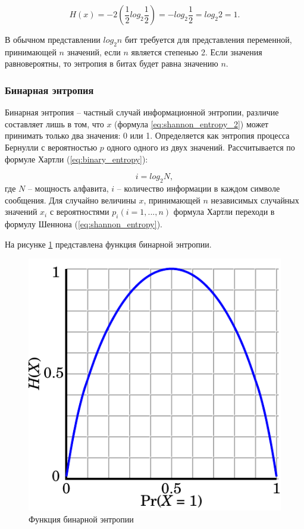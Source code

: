 \begin{equation}\label{eq:moneta}
	H(x) = -2(\frac{1}{2}log_{2}{\frac{1}{2}}) = -log_{2}{\frac{1}{2}}=log_{2}{2} = 1.
\end{equation}

В обычном представлении $log_{2}n$ бит требуется для представления переменной, принимающей $n$ значений, если $n$ является степенью 2. Если значения равновероятны, то энтропия в битах будет равна значению $n$.

\subsubsection{Бинарная энтропия}

Бинарная энтропия -- частный случай информационной энтропии, различие составляет лишь в том, что $x$ (формула \ref{eq:shannon_entropy_2}) может принимать только два значения: 0 или 1. Определяется как энтропия процесса Бернулли \cite{bernoulli-process} с вероятностью $p$ одного одного из двух значений. Рассчитывается по формуле Хартли (\ref{eq:binary_entropy}):

\begin{equation}\label{eq:binary_entropy}
	i = log_{2}{N},
\end{equation}
где $N$ -- мощность алфавита, $i$ -- количество информации в каждом символе сообщения. Для случайно величины $x$, принимающей $n$ независимых случайных значений $x_{i}$ с вероятностями $p_{i}(i = 1,...,n)$ формула Хартли переходи в формулу Шеннона (\ref{eq:shannon_entropy}).

На рисунке \ref{fig:binary_entropy} представлена функция бинарной энтропии.

\begin{figure}[h]
	\centering
	\includegraphics[scale=1]{img/entropy.pdf}
	\caption{Функция бинарной энтропии}
	\label{fig:binary_entropy}
\end{figure}

